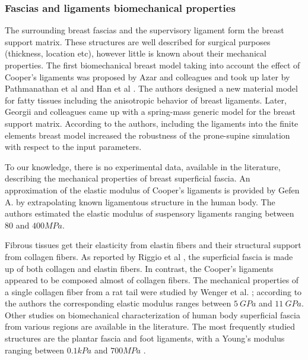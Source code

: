 \subsubsection*{Fascias and ligaments biomechanical properties}
The surrounding breast fascias and the supervisory ligament form the breast support matrix. These structures are well described for surgical purposes (thickness, location etc), however little is known about their mechanical properties. The first biomechanical breast model taking into account the effect of Cooper's ligaments was proposed by Azar and colleagues \citep{azar_methods_2002} and took up later by Pathmanathan et al \citep{pathmanathan_predicting_2008} and Han et al \citep{han_development_2012}. The authors designed a new material model for fatty tissues including the anisotropic behavior of breast ligaments. Later, Georgii and colleagues \citep{georgii_simulation_2016} came up with a spring-mass generic model for the breast support matrix. According to the authors, including the ligaments into the finite elements breast model increased the robustness of the prone-supine simulation with respect to the input parameters. 

 To our knowledge, there is no experimental data, available in the literature, describing the mechanical properties of breast superficial fascia. An approximation of the elastic modulus of Cooper's ligaments is provided by Gefen A. \citep{gefen_mechanics_2007} by extrapolating known ligamentous structure in the human body. The authors estimated the elastic modulus of suspensory ligaments ranging between $80$ and $400 MPa$.
 
 Fibrous tissues get their elasticity from elastin  fibers and their structural support from collagen fibers. As reported by Riggio et al \citep{riggio_anatomical_2000}, the superficial fascia is made up of both collagen and elastin fibers. In contrast, the Cooper's ligaments appeared to be composed almost of collagen fibers.  The mechanical properties of a single collagen fiber from a rat tail were studied by Wenger et al. \citep{wenger_mechanical_2007}; according to the authors the corresponding elastic modulus ranges between $5\ GPa$ and $11\ GPa$. Other studies on biomechanical characterization of human body superficial fascia from various regions are available in the literature. The most frequently studied structures are the plantar fascia and foot ligaments, with a Young's modulus ranging between $0.1 kPa$ \citep{gefen_vivo_2003} and $700 MPa $ \citep{cheung_effects_2004}. 

